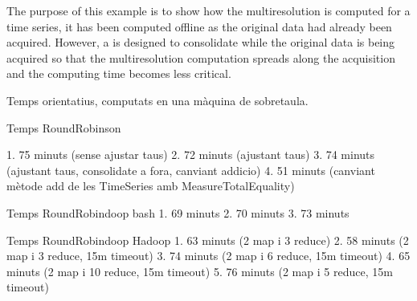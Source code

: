   The purpose
of this example is to show how the multiresolution is computed for a
time series, it has been computed offline as the original data had
already been acquired. However, a  is designed to
consolidate while the original data is being acquired so that the
multiresolution computation spreads along the acquisition and the
computing time becomes less critical.



Temps orientatius, computats en una màquina de sobretaula. 

Temps RoundRobinson

1. 75 minuts (sense ajustar taus)
2. 72 minuts (ajustant taus)
3. 74 minuts (ajustant taus, consolidate a fora, canviant addicio)
4. 51 minuts (canviant mètode add de les TimeSeries amb MeasureTotalEquality)




Temps RoundRobindoop bash
1. 69 minuts
2. 70 minuts
3. 73 minuts


Temps RoundRobindoop Hadoop
1. 63 minuts  (2 map i 3 reduce)
2. 58 minuts  (2 map i 3 reduce, 15m timeout)
3. 74 minuts (2 map i 6 reduce, 15m timeout)
4. 65 minuts (2 map i 10 reduce, 15m timeout)
5. 76 minuts (2 map i 5 reduce, 15m timeout)




